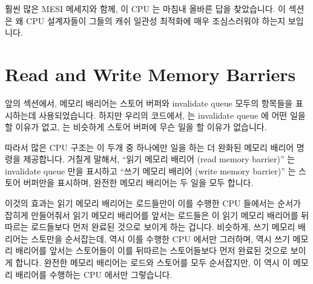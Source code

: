 훨씬 많은 MESI 메세지와 함께, 이 CPU 는 마침내 올바른 답을 찾았습니다.
이 섹션은 왜 CPU 설계자들이 그들의 캐쉬 일관성 최적화에 매우 조심스러워야
하는지 보입니다.

\iffalse

With much passing of MESI messages, the CPUs arrive at the correct answer.
This section illustrates why CPU designers must be extremely careful
with their cache-coherence optimizations.

\fi

\section{Read and Write Memory Barriers}
\label{sec:app:whymb:Read and Write Memory Barriers}

앞의 섹션에서, 메모리 배리어는 스토어 버퍼와 invalidate queue 모두의 항목들을
표시하는데 사용되었습니다.
하지만 우리의 코드에서,  는 invalidate queue 에 어떤 일을 할 이유가
없고,  는 비슷하게 스토어 버퍼에 무슨 일을 할 이유가 없습니다.

따라서 많은 CPU 구조는 이 두개 중 하나에만 일을 하는 더 완화된 메모리 배리어
명령을 제공합니다.
거칠게 말해서, ``읽기 메모리 배리어 (read memory barrier)'' 는 invalidate queue
만을 표시하고 ``쓰기 메모리 배리어 (write memory barrier)'' 는 스토어 버퍼만을
표시하며, 완전한 메모리 배리어는 두 일을 모두 합니다.

\iffalse

In the previous section, memory barriers were used to mark entries in
both the store buffer and the invalidate queue.
But in our code fragment, \co{foo()} had no reason to do anything
with the invalidate queue, and \co{bar()} similarly had no reason
to do anything with the store buffer.

Many CPU architectures therefore provide weaker memory-barrier
instructions that do only one or the other of these two.
Roughly speaking, a ``read memory barrier'' marks only the invalidate
queue and a ``write memory barrier'' marks only the store buffer,
while a full-fledged memory barrier does both.

\fi

이것의 효과는 읽기 메모리 배리어는 로드들만이 이를 수행한 CPU 들에서는 순서가
잡히게 만들어줘서 읽기 메모리 배리어를 앞서는 로드들은 이 읽기 메모리 배리어를
뒤따르는 로드들보다 먼저 완료된 것으로 보이게 하는 겁니다.
비슷하게, 쓰기 메모리 배리어는 스토만을 순서잡는데, 역시 이를 수행한 CPU 에서만
그러하며, 역시 쓰기 메모리 배리어를 앞서는 스토어들이 이를 뒤따르는
스토어들보다 먼저 완료된 것으로 보이게 합니다.
완전한 메모리 배리어는 로드와 스토어를 모두 순서잡지만, 이 역시 이 메모리
배리어를 수행하는 CPU 에서만 그렇습니다.

